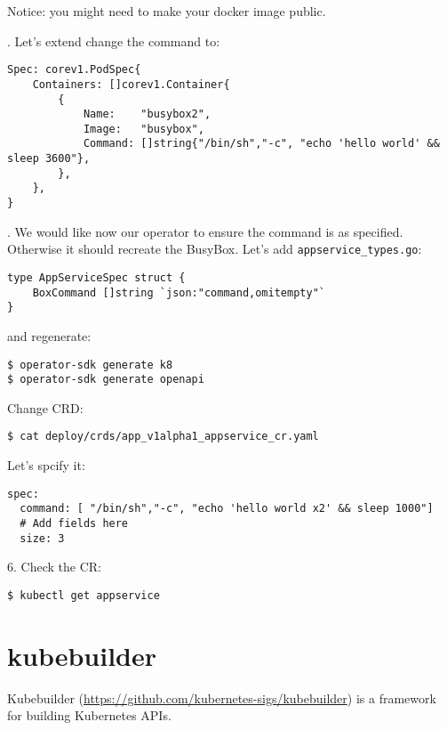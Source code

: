 \documentclass[11pt, letterpaper]{article}
\begin{document}
Notice: you might need to make your docker image public.

. Let's extend change the command to:

\begin{verbatim}
Spec: corev1.PodSpec{
    Containers: []corev1.Container{
        {
            Name:    "busybox2",
            Image:   "busybox",
            Command: []string{"/bin/sh","-c", "echo 'hello world' && sleep 3600"},
        },
    },
}
\end{verbatim}

. We would like now our operator to ensure the command is as specified. Otherwise it should recreate the BusyBox. Let's add \verb|appservice_types.go|:

\begin{verbatim}
type AppServiceSpec struct {
	BoxCommand []string `json:"command,omitempty"`
}
\end{verbatim}

and regenerate:

\begin{verbatim}
$ operator-sdk generate k8
$ operator-sdk generate openapi
\end{verbatim}

Change {\small CRD}:

\begin{verbatim}
$ cat deploy/crds/app_v1alpha1_appservice_cr.yaml
\end{verbatim}


Let's spcify it:

\begin{verbatim}
spec:
  command: [ "/bin/sh","-c", "echo 'hello world x2' && sleep 1000"]
  # Add fields here
  size: 3
\end{verbatim}

6. Check the {\small CR}:

\begin{verbatim}
$ kubectl get appservice
\end{verbatim}


\section{kubebuilder}

Kubebuilder (\href{https://github.com/kubernetes-sigs/kubebuilder}{https://github.com/kubernetes-sigs/kubebuilder}) is a framework for building Kubernetes {\small API}s.
\end{document}
